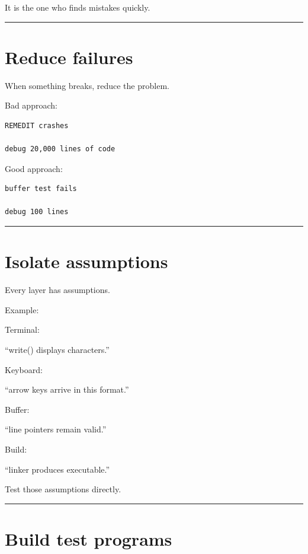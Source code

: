 \documentclass[
  oneside,
  openany]{book}
\begin{document}
It is the one who finds mistakes quickly.

\begin{center}\rule{0.5\linewidth}{0.5pt}\end{center}

\hypertarget{reduce-failures}{%
\section{Reduce failures}\label{reduce-failures}}

When something breaks, reduce the problem.

Bad approach:

\begin{verbatim}
REMEDIT crashes

debug 20,000 lines of code
\end{verbatim}

Good approach:

\begin{verbatim}
buffer test fails

debug 100 lines
\end{verbatim}

\begin{center}\rule{0.5\linewidth}{0.5pt}\end{center}

\hypertarget{isolate-assumptions}{%
\section{Isolate assumptions}\label{isolate-assumptions}}

Every layer has assumptions.

Example:

Terminal:

``write() displays characters.''

Keyboard:

``arrow keys arrive in this format.''

Buffer:

``line pointers remain valid.''

Build:

``linker produces executable.''

Test those assumptions directly.

\begin{center}\rule{0.5\linewidth}{0.5pt}\end{center}

\hypertarget{build-test-programs}{%
\section{Build test programs}\label{build-test-programs}}
\end{document}
